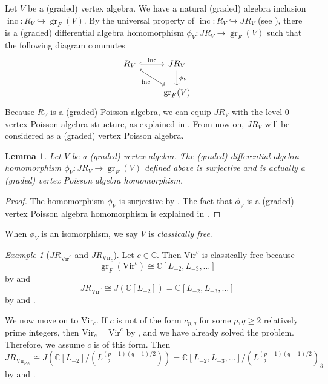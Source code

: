\documentclass[a4paper, 12pt, reqno]{amsart}
\newtheorem{lemma}[theorem]{Lemma}
\theoremstyle{remark}
\newtheorem{example}[theorem]{Example}
\DeclareMathOperator{\gr}{gr}
\DeclareMathOperator{\inc}{inc}
\newcommand{\Vir}{{\mathrm{Vir}}}
\begin{document}
Let $V$ be a (graded) vertex algebra.
We have a natural (graded) algebra inclusion $\inc: R_V \hookrightarrow \gr_F(V)$.
By the universal property of $\inc: R_V \hookrightarrow JR_V$ (see ), there is a (graded) differential algebra homomorphism $\phi_V: JR_V \to \gr_F(V)$ such that the following diagram commutes
\begin{equation*}
  \begin{tikzcd}
    R_V \arrow[rd, "\inc"', hook] \arrow[r, "\inc", hook] & JR_V \arrow[d, "\phi_V"] \\
    & \gr_F(V)
  \end{tikzcd}
\end{equation*}
Because $R_V$ is a (graded) Poisson algebra, we can equip $JR_V$ with the level 0 vertex Poisson algebra structure, as explained in .
From now on, $JR_V$ will be considered as a (graded) vertex Poisson algebra.

\begin{lemma}
  \label{lmm:8}
  Let $V$ be a (graded) vertex algebra.
  The (graded) differential algebra homomorphism $\phi_V: JR_V \to \gr_F(V)$ defined above is surjective and is actually a (graded) vertex Poisson algebra homomorphism.
\end{lemma}

\begin{proof}
  The homomorphism $\phi_V$ is surjective by .
  The fact that $\phi_V$ is a (graded) vertex Poisson algebra homomorphism is explained in \cite[Proposition 2.5.1]{arakawa_remark_2012}.
\end{proof}

When $\phi_V$ is an isomorphism, we say $V$ is \emph{classically free}.

\begin{example}[$JR_{\Vir^c}$ and $JR_{\Vir_c}$]
  \label{exa:7}
  Let $c \in \mathbb{C}$.
  Then $\Vir^c$ is classically free because
  \begin{equation*}
    \gr_F(\Vir^c) \cong \mathbb{C}[L_{-2}, L_{-3}, \dots]
  \end{equation*}
  by  and
  \begin{equation*}
    JR_{\Vir^c} \cong J(\mathbb{C}[L_{-2}]) = \mathbb{C}[L_{-2}, L_{-3}, \dots]
  \end{equation*}
  by  and .

  We now move on to $\Vir_c$.
  If $c$ is not of the form $c_{p, q}$ for some $p, q \ge 2$ relatively prime integers, then $\Vir_c = \Vir^c$ by , and we have already solved the problem.
  Therefore, we assume $c$ is of this form.
  Then
  \begin{equation*}
    JR_{\Vir_{p, q}} \cong J(\mathbb{C}[L_{-2}]/(L_{-2}^{(p - 1)(q - 1)/2})) = \mathbb{C}[L_{-2}, L_{-3}, \dots]/(L_{-2}^{(p - 1)(q - 1)/2})_\partial
  \end{equation*}
  by  and .
\end{example}
\end{document}
